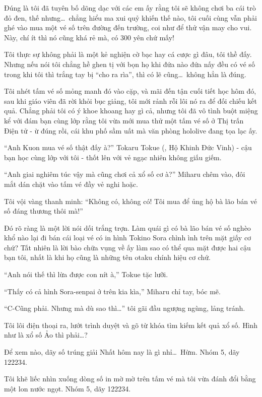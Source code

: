 \documentclass[../main.tex]{subfiles}
\begin{document}
Đúng là tôi đã tuyên bố dõng dạc với các em ấy rằng tôi sẽ không chơi ba cái trò đỏ đen, thế nhưng\dots\ chẳng hiểu ma xui quỷ khiến thế nào, tôi cuối cùng vẫn phải ghé vào mua một vé số trên đường đến trường, coi như để thử vận may cho vui. Này, chí ít thì nó cũng khá rẻ mà, có 300 yên chứ mấy!

Tôi thực sự không phải là một kẻ nghiện cờ bạc hay cá cược gì đâu, tôi thề đấy. Nhưng nếu nói tôi chẳng hề ghen tị với bọn họ khi đứa nào đứa nấy đều có vé số trong khi tôi thì trắng tay bị ``cho ra rìa'', thì có lẽ cũng\dots\ không hẳn là đúng.

Tôi nhét tấm vé số mỏng manh đó vào cặp, và mãi đến tận cuối tiết học hôm đó, sau khi giáo viên đã rời khỏi bục giảng, tôi mới rảnh rỗi lôi nó ra để đối chiếu kết quả. Chẳng phải tôi có ý khoe khoang hay gì cả, nhưng tôi đã vô tình buột miệng kể với đám bạn cùng lớp rằng tôi vừa mới mua thử một tấm vé số ở Thị trấn Điện tử - ừ đúng rồi, cái khu phố sầm uất mà văn phòng hololive đang tọa lạc ấy.

``Anh Kuon mua vé số thật đấy à?'' Tokaru Tokue (, Hộ Khinh Đức Vinh) - cậu bạn học cùng lớp với tôi - thốt lên với vẻ ngạc nhiên không giấu giếm.

``Anh giai nghiêm túc vậy mà cũng chơi cả xổ số cơ à?'' Miharu chêm vào, đôi mắt dán chặt vào tấm vé đầy vẻ nghi hoặc.

Tôi vội vàng thanh minh: ``Không có, không có! Tôi mua để ủng hộ bà lão bán vé số đáng thương thôi mà!''

Đó rõ ràng là một lời nói dối trắng trợn. Làm quái gì có bà lão bán vé số nghèo khổ nào lại đi bán cái loại vé có in hình Tokino Sora chình ình trên mặt giấy cơ chứ? Tất nhiên là lời bào chữa vụng về ấy làm sao có thể qua mặt được hai cậu bạn tôi, nhất là khi họ cũng là những tên otaku chính hiệu cơ chứ.

``Anh nói thế thì lừa được con nít à,'' Tokue tặc lưỡi.

``Thấy có cả hình Sora-senpai ở trên kia kìa,'' Miharu chỉ tay, bóc mẽ.

``C-Cũng phải. Nhưng mà dù sao thì\dots'' tôi gãi đầu ngượng ngùng, lảng tránh.

Tôi lôi điện thoại ra, lướt trình duyệt và gõ từ khóa tìm kiếm kết quả xổ số. Hình như là xổ số Ảo thì phải\dots?

Để xem nào, dãy số trúng giải Nhất hôm nay là gì nhỉ\dots\ Hừm. Nhóm 5, dãy 122234.

Tôi khẽ liếc nhìn xuống dòng số in mờ mờ trên tấm vé mà tôi vừa đánh đổi bằng một lon nước ngọt. Nhóm 5, dãy 122234.
\end{document}
